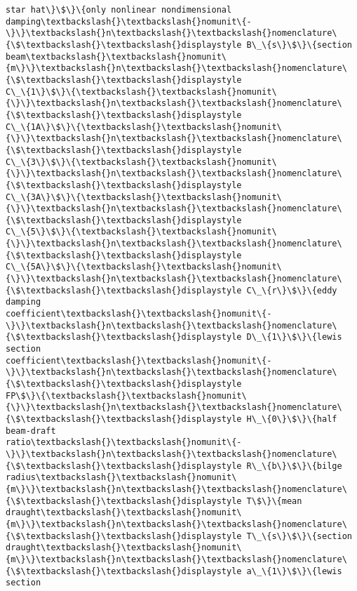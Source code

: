 \begin{tcolorbox}[breakable, size=fbox, boxrule=.5pt, pad at break*=1mm, opacityfill=0]
\begin{Verbatim}[commandchars=\\\{\}]
star hat\}\$\}\{only nonlinear nondimensional
damping\textbackslash{}\textbackslash{}nomunit\{-\}\}\textbackslash{}n\textbackslash{}\textbackslash{}nomenclature\{\$\textbackslash{}\textbackslash{}displaystyle B\_\{s\}\$\}\{section
beam\textbackslash{}\textbackslash{}nomunit\{m\}\}\textbackslash{}n\textbackslash{}\textbackslash{}nomenclature\{\$\textbackslash{}\textbackslash{}displaystyle
C\_\{1\}\$\}\{\textbackslash{}\textbackslash{}nomunit\{\}\}\textbackslash{}n\textbackslash{}\textbackslash{}nomenclature\{\$\textbackslash{}\textbackslash{}displaystyle
C\_\{1A\}\$\}\{\textbackslash{}\textbackslash{}nomunit\{\}\}\textbackslash{}n\textbackslash{}\textbackslash{}nomenclature\{\$\textbackslash{}\textbackslash{}displaystyle
C\_\{3\}\$\}\{\textbackslash{}\textbackslash{}nomunit\{\}\}\textbackslash{}n\textbackslash{}\textbackslash{}nomenclature\{\$\textbackslash{}\textbackslash{}displaystyle
C\_\{3A\}\$\}\{\textbackslash{}\textbackslash{}nomunit\{\}\}\textbackslash{}n\textbackslash{}\textbackslash{}nomenclature\{\$\textbackslash{}\textbackslash{}displaystyle
C\_\{5\}\$\}\{\textbackslash{}\textbackslash{}nomunit\{\}\}\textbackslash{}n\textbackslash{}\textbackslash{}nomenclature\{\$\textbackslash{}\textbackslash{}displaystyle
C\_\{5A\}\$\}\{\textbackslash{}\textbackslash{}nomunit\{\}\}\textbackslash{}n\textbackslash{}\textbackslash{}nomenclature\{\$\textbackslash{}\textbackslash{}displaystyle C\_\{r\}\$\}\{eddy damping
coefficient\textbackslash{}\textbackslash{}nomunit\{-\}\}\textbackslash{}n\textbackslash{}\textbackslash{}nomenclature\{\$\textbackslash{}\textbackslash{}displaystyle D\_\{1\}\$\}\{lewis section
coefficient\textbackslash{}\textbackslash{}nomunit\{-\}\}\textbackslash{}n\textbackslash{}\textbackslash{}nomenclature\{\$\textbackslash{}\textbackslash{}displaystyle
FP\$\}\{\textbackslash{}\textbackslash{}nomunit\{\}\}\textbackslash{}n\textbackslash{}\textbackslash{}nomenclature\{\$\textbackslash{}\textbackslash{}displaystyle H\_\{0\}\$\}\{half beam-draft
ratio\textbackslash{}\textbackslash{}nomunit\{-\}\}\textbackslash{}n\textbackslash{}\textbackslash{}nomenclature\{\$\textbackslash{}\textbackslash{}displaystyle R\_\{b\}\$\}\{bilge
radius\textbackslash{}\textbackslash{}nomunit\{m\}\}\textbackslash{}n\textbackslash{}\textbackslash{}nomenclature\{\$\textbackslash{}\textbackslash{}displaystyle T\$\}\{mean
draught\textbackslash{}\textbackslash{}nomunit\{m\}\}\textbackslash{}n\textbackslash{}\textbackslash{}nomenclature\{\$\textbackslash{}\textbackslash{}displaystyle T\_\{s\}\$\}\{section
draught\textbackslash{}\textbackslash{}nomunit\{m\}\}\textbackslash{}n\textbackslash{}\textbackslash{}nomenclature\{\$\textbackslash{}\textbackslash{}displaystyle a\_\{1\}\$\}\{lewis section

\end{Verbatim}
\end{tcolorbox}
